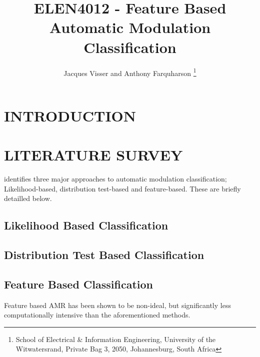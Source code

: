 \documentclass[10pt,twocolumn]{witseiepaper}
\begin{document}
\title{ELEN4012 - Feature Based Automatic Modulation Classification}

\author{Jacques Visser and Anthony Farquharson
\thanks{School of Electrical \& Information Engineering, University of the
Witwatersrand, Private Bag 3, 2050, Johannesburg, South Africa}
}



\maketitle
\thispagestyle{empty}\pagestyle{empty}

\section{INTRODUCTION}

\section{LITERATURE SURVEY}
\cite{zhu2014automatic} identifies three major approaches to automatic modulation classification; Likelihood-based, distribution test-based and feature-based. These are briefly detailled below.
	\subsection{Likelihood Based Classification}
	\subsection{Distribution Test Based Classification}
	\subsection{Feature Based Classification}
	Feature based AMR has been shown to be non-ideal, but significantly less computationally intensive \cite{zhu2014automatic} than the aforementioned methods.
\end{document}
